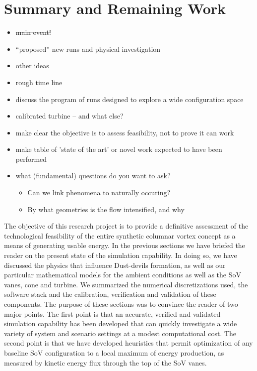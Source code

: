 \section{Summary and Remaining Work}
\label{sec:future_work}

\begin{itemize}
\item \st{main event!}
\item ``proposed'' new runs and physical investigation
\item other ideas
\item rough time line
\item discuss the program of runs designed to explore a wide configuration space
\item calibrated turbine -- and what else?
\item make clear the objective is to assess feasibility, not to prove it can work
\item make table of 'state of the art' or novel work expected to have been performed
\item what (fundamental) questions do you want to ask?
      \begin{itemize}
      \item Can we link phenomena to naturally occuring?
      \item By what geometries is the flow intensified, and why
      \end{itemize}
\end{itemize}

The objective of this research project is to provide a definitive assessment of the 
technological feasibility of the entire synthetic columnar vortex concept as a 
means of generating usable energy. In the 
previous sections we have briefed the reader on the present state of the simulation capability. 
In doing so, we have discussed the physics that influence 
Dust-devils formation, as well as our particular mathematical models for the ambient conditions 
as well as the SoV vanes, cone and turbine. We summarized the numerical discretizations used, the software stack 
and the calibration, verification and validation of these components. 
The purpose of these sections was to convince the reader of two major points. 
The first point is that an accurate, verified and validated simulation capability has been developed
that can quickly investigate a wide variety of system and scenario settings 
at a modest computational cost. 
The second point is that we have developed heuristics that permit optimization of any baseline SoV
configuration to a local maximum of energy production, as measured by kinetic energy flux 
through the top of the SoV vanes. 

